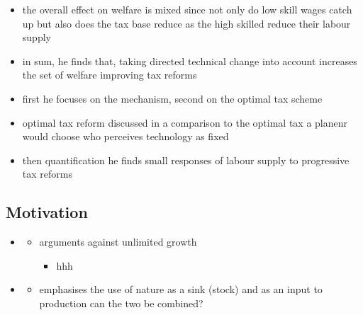 \begin{itemize}
\begin{itemize}
	\item the overall effect on welfare is mixed since not only do low skill wages catch up but also does the tax base reduce as the high skilled reduce their labour supply
	\item in sum, he finds that, taking directed technical change into account increases the set of welfare improving tax reforms 
	\item first he focuses on the mechanism, second on the optimal tax scheme
	\item optimal tax reform discussed in a comparison to the optimal tax a planenr would choose who perceives technology as fixed
	\item then quantification \ar he finds small responses of labour supply to progressive tax reforms
\end{itemize}
\end{itemize}


\subsection{Motivation}
\begin{itemize}
\item \cite{Schor2005SustainableReduction}
\begin{itemize}
	\item arguments against unlimited growth
	\begin{itemize}
\item hhh
	\end{itemize}
\end{itemize}
\item \cite{Dasgupta2021}
\begin{itemize}
\item emphasises the use of nature as a sink (stock) and as an input to production \ar can the two be combined?
\end{itemize}
\end{itemize}
